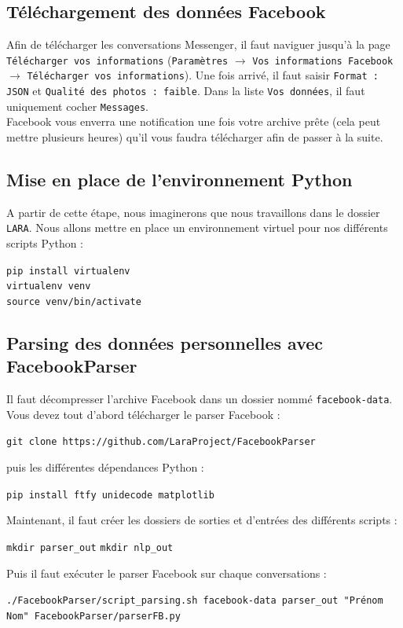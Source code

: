 \documentclass[10pt,a4paper]{article}
\newcommand\tab[1][0.5cm]{\hspace*{#1}}
\begin{document}
\subsection{Téléchargement des données Facebook}
Afin de télécharger les conversations Messenger, il faut naviguer jusqu'à la page \texttt{Télécharger vos informations} (\texttt{Paramètres} $\longrightarrow$ \texttt{Vos informations Facebook} $\longrightarrow$ \texttt{Télécharger vos informations}). Une fois arrivé, il faut saisir \texttt{Format : JSON} et \texttt{Qualité des photos : faible}. Dans la liste \texttt{Vos données}, il faut uniquement cocher \texttt{Messages}. \\
\tab Facebook vous enverra une notification une fois votre archive prête (cela peut mettre plusieurs heures) qu'il vous faudra télécharger afin de passer à la suite.
\subsection{Mise en place de l'environnement Python}
A partir de cette étape, nous imaginerons que nous travaillons dans le dossier \texttt{LARA}. Nous allons mettre en place un environnement virtuel pour nos différents scripts Python :
\begin{center}
\texttt{pip install virtualenv} \\
\texttt{virtualenv venv} \\
\texttt{source venv/bin/activate}
\end{center}
\subsection{Parsing des données personnelles avec FacebookParser}
Il faut décompresser l'archive Facebook dans un dossier nommé \texttt{facebook-data}. \\
Vous devez tout d'abord télécharger le parser Facebook :
\begin{center}
\texttt{git clone https://github.com/LaraProject/FacebookParser}
\end{center}
puis les différentes dépendances Python :
\begin{center}
\texttt{pip install ftfy unidecode matplotlib}
\end{center}
Maintenant, il faut créer les dossiers de sorties et d'entrées des différents scripts :
\begin{center}
\texttt{mkdir parser\_out}
\texttt{mkdir nlp\_out}
\end{center}
Puis il faut exécuter le parser Facebook sur chaque conversations :
\begin{center}
\texttt{./FacebookParser/script\_parsing.sh facebook-data parser\_out "Prénom Nom" FacebookParser/parserFB.py}
\end{center}
\end{document}
